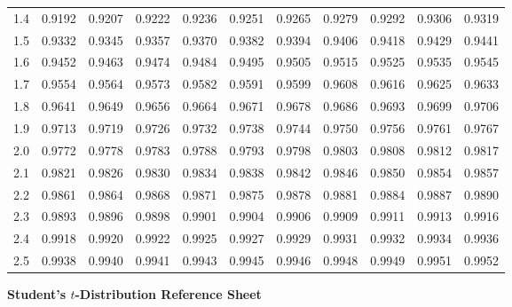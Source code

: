 \begin{center}
\begin{tabular}{|c!{\color{black!85}\vrule width 1.8pt}c|c|c|c|c|c|c|c|c|c|}
			1.4 & 0.9192 & 0.9207 & 0.9222 & 0.9236 & 0.9251 & 0.9265 & 0.9279 & 0.9292 & 0.9306 & 0.9319\\
			1.5 & 0.9332 & 0.9345 & 0.9357 & 0.9370 & 0.9382 & 0.9394 & 0.9406 & 0.9418 & 0.9429 & 0.9441\\
			1.6 & 0.9452 & 0.9463 & 0.9474 & 0.9484 & 0.9495 & 0.9505 & 0.9515 & 0.9525 & 0.9535 & 0.9545\\
			1.7 & 0.9554 & 0.9564 & 0.9573 & 0.9582 & 0.9591 & 0.9599 & 0.9608 & 0.9616 & 0.9625 & 0.9633\\
			1.8 & 0.9641 & 0.9649 & 0.9656 & 0.9664 & 0.9671 & 0.9678 & 0.9686 & 0.9693 & 0.9699 & 0.9706\\
			1.9 & 0.9713 & 0.9719 & 0.9726 & 0.9732 & 0.9738 & 0.9744 & 0.9750 & 0.9756 & 0.9761 & 0.9767\\
			2.0 & 0.9772 & 0.9778 & 0.9783 & 0.9788 & 0.9793 & 0.9798 & 0.9803 & 0.9808 & 0.9812 & 0.9817\\
			2.1 & 0.9821 & 0.9826 & 0.9830 & 0.9834 & 0.9838 & 0.9842 & 0.9846 & 0.9850 & 0.9854 & 0.9857\\
			2.2 & 0.9861 & 0.9864 & 0.9868 & 0.9871 & 0.9875 & 0.9878 & 0.9881 & 0.9884 & 0.9887 & 0.9890\\
			2.3 & 0.9893 & 0.9896 & 0.9898 & 0.9901 & 0.9904 & 0.9906 & 0.9909 & 0.9911 & 0.9913 & 0.9916\\
			2.4 & 0.9918 & 0.9920 & 0.9922 & 0.9925 & 0.9927 & 0.9929 & 0.9931 & 0.9932 & 0.9934 & 0.9936\\
			2.5 & 0.9938 & 0.9940 & 0.9941 & 0.9943 & 0.9945 & 0.9946 & 0.9948 & 0.9949 & 0.9951 & 0.9952\\
			\hline
		\end{tabular}
		
	\end{center}
	
	
	\newpage
	

\begin{center}
	{\Large\textbf{Student's \(t\)-Distribution Reference Sheet}}
\end{center}

\vspace{0.1cm}

